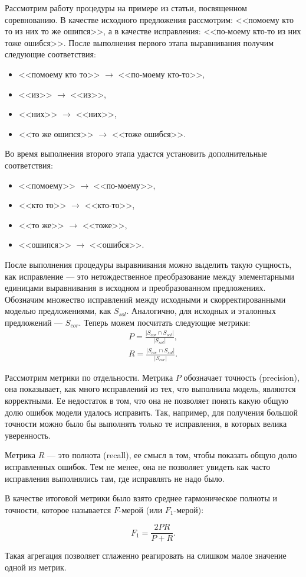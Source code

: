 Рассмотрим работу процедуры на примере из статьи, посвященном соревнованию. В качестве исходного предложения рассмотрим: <<помоему кто то из них то же ошипся>>, а в качестве исправления: <<по-моему кто-то из них тоже ошибся>>.  После выполнения первого этапа выравнивания получим следующие соответствия:

\begin{itemize}
	\item <<помоему кто то>> $\rightarrow$ <<по-моему кто-то>>,
	\item <<из>> $\rightarrow$ <<из>>,
	\item <<них>> $\rightarrow$ <<них>>,
	\item <<то же ошипся>> $\rightarrow$ <<тоже ошибся>>.
\end{itemize}

Во время выполнения второго этапа удастся установить дополнительные соответствия:

\begin{itemize}
	\item <<помоему>> $\rightarrow$ <<по-моему>>,
	\item <<кто то>> $\rightarrow$ <<кто-то>>,
	\item <<то же>> $\rightarrow$ <<тоже>>,
	\item <<ошипся>> $\rightarrow$ <<ошибся>>.
\end{itemize}

После выполнения процедуры выравнивания можно выделить такую сущность, как исправление --- это нетождественное преобразование между элементарными единицами выравнивания в исходном и преобразованном предложениях. Обозначим множество исправлений между исходными и скорректированными моделью предложениями, как $S_{sol}$. Аналогично, для исходных и эталонных предложений --- $S_{cor}$. Теперь можем посчитать следующие метрики:
\begin{gather*}
	P = \frac{\vert S_{cor} \cap S_{sol} \vert}{\vert S_{sol} \vert},
	\\
	R = \frac{\vert S_{cor} \cap S_{sol} \vert}{\vert S_{cor} \vert}.
\end{gather*}

Рассмотрим метрики по отдельности. Метрика $P$ обозначает точность (precision), она показывает, как много исправлений из тех, что выполнила модель, являются корректными. Ее недостаток в том, что она не позволяет понять какую общую долю ошибок модели удалось исправить. Так, например, для получения большой точности можно было бы выполнять только те исправления, в которых велика уверенность.

Метрика $R$ --- это полнота (recall), ее смысл в том, чтобы показать общую долю исправленных ошибок. Тем не менее, она не позволяет увидеть как часто исправления выполнялись там, где исправлять не надо было.

В качестве итоговой метрики было взято среднее гармоническое полноты и точности, которое называется $F$-мерой (или $F_1$-мерой):

\begin{equation*}
	F_1 = \frac{2PR}{P + R}.
\end{equation*}

Такая агрегация позволяет сглаженно реагировать на слишком малое значение одной из метрик.
